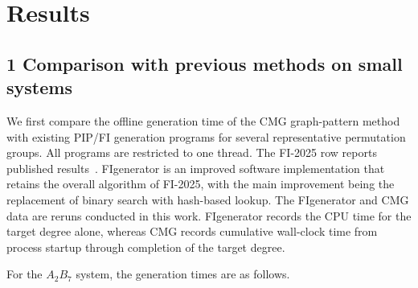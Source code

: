 \section{Results}\label{sec:results}

\subsection{1 Comparison with previous methods on small systems}\label{sec:small-system-comparison}

We first compare the offline generation time of the CMG graph-pattern method with existing PIP/FI generation programs for several representative permutation groups. All programs are restricted to one thread.
The FI-2025 row reports published results~\cite{Hao2025PIPFIAlgorithms}. FIgenerator is an improved software implementation that retains the overall algorithm of FI-2025, with the main improvement being the replacement of binary search with hash-based lookup. The FIgenerator and CMG data are reruns conducted in this work.
FIgenerator records the CPU time for the target degree alone, whereas CMG records cumulative wall-clock time from process startup through completion of the target degree.


For the \(A_2B_7\) system, the generation times are as follows.

